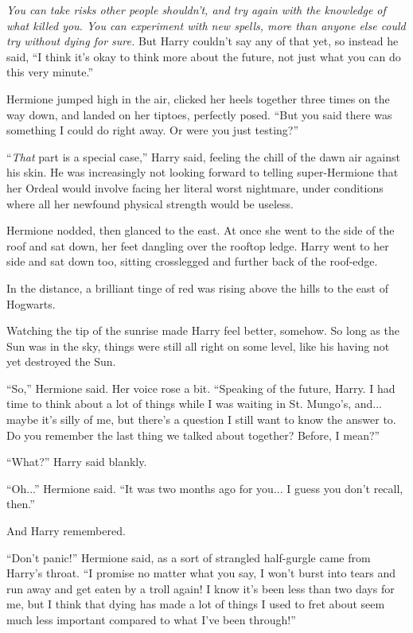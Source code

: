 \emph{You can take risks other people shouldn't, and try again with the knowledge of what killed you. You can experiment with new spells, more than anyone else could try without dying for sure.} But Harry couldn't say any of that yet, so instead he said, ``I think it's okay to think more about the future, not just what you can do this very minute.''

Hermione jumped high in the air, clicked her heels together three times on the way down, and landed on her tiptoes, perfectly posed. ``But you said there was something I could do right away. Or were you just testing?''

``\emph{That} part is a special case,'' Harry said, feeling the chill of the dawn air against his skin. He was increasingly not looking forward to telling super-Hermione that her Ordeal would involve facing her literal worst nightmare, under conditions where all her newfound physical strength would be useless.

Hermione nodded, then glanced to the east. At once she went to the side of the roof and sat down, her feet dangling over the rooftop ledge. Harry went to her side and sat down too, sitting crosslegged and further back of the roof-edge.

In the distance, a brilliant tinge of red was rising above the hills to the east of Hogwarts.

Watching the tip of the sunrise made Harry feel better, somehow. So long as the Sun was in the sky, things were still all right on some level, like his having not yet destroyed the Sun.

``So,'' Hermione said. Her voice rose a bit. ``Speaking of the future, Harry. I had time to think about a lot of things while I was waiting in St. Mungo's, and... maybe it's silly of me, but there's a question I still want to know the answer to. Do you remember the last thing we talked about together? Before, I mean?''

``What?'' Harry said blankly.

``Oh...'' Hermione said. ``It was two months ago for you... I guess you don't recall, then.''

And Harry remembered.

``Don't panic!'' Hermione said, as a sort of strangled half-gurgle came from Harry's throat. ``I promise no matter what you say, I won't burst into tears and run away and get eaten by a troll again! I know it's been less than two days for me, but I think that dying has made a lot of things I used to fret about seem much less important compared to what I've been through!''

